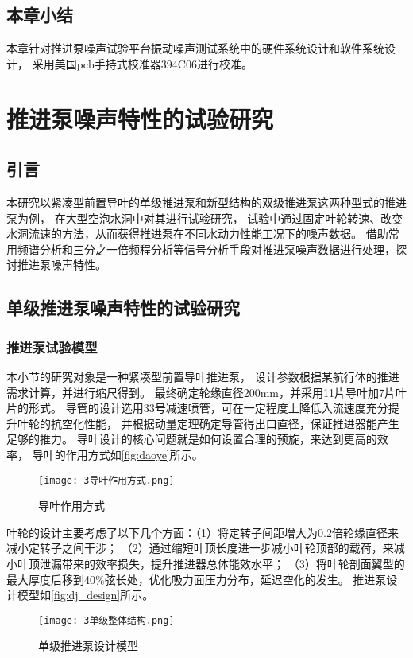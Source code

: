 \section{本章小结}
本章针对推进泵噪声试验平台振动噪声测试系统中的硬件系统设计和软件系统设计，
采用美国pcb手持式校准器394C06进行校准。

\chapter{推进泵噪声特性的试验研究}\label{ch:chapter3}
\section{引言}
本研究以紧凑型前置导叶的单级推进泵和新型结构的双级推进泵这两种型式的推进泵为例，
在大型空泡水洞中对其进行试验研究，
试验中通过固定叶轮转速、改变水洞流速的方法，从而获得推进泵在不同水动力性能工况下的噪声数据。
借助常用频谱分析和三分之一倍频程分析等信号分析手段对推进泵噪声数据进行处理，探讨推进泵噪声特性。
\section{单级推进泵噪声特性的试验研究}
\subsection{推进泵试验模型}
本小节的研究对象是一种紧凑型前置导叶推进泵，
设计参数根据某航行体的推进需求计算，并进行缩尺得到。
最终确定轮缘直径200mm，并采用11片导叶加7片叶片的形式。
导管的设计选用33号减速喷管，可在一定程度上降低入流速度充分提升叶轮的抗空化性能，
并根据动量定理确定导管得出口直径，保证推进器能产生足够的推力。
导叶设计的核心问题就是如何设置合理的预旋，来达到更高的效率，
导叶的作用方式如\autoref{fig:daoye}所示。
\begin{figure}[htbp]
    \centering
    \texttt{[image: 3导叶作用方式.png]}
    \caption{\label{fig:daoye}导叶作用方式}
\end{figure}
叶轮的设计主要考虑了以下几个方面：（1）将定转子间距增大为0.2倍轮缘直径来减小定转子之间干涉；
（2）通过缩短叶顶长度进一步减小叶轮顶部的载荷，来减小叶顶泄漏带来的效率损失，提升推进器总体能效水平；
（3）将叶轮剖面翼型的最大厚度后移到40\%弦长处，优化吸力面压力分布，延迟空化的发生。
推进泵设计模型如\autoref{fig:dj_design}所示。
\begin{figure}[htbp]
    \centering
    \texttt{[image: 3单级整体结构.png]}
    \caption{\label{fig:dj_design}单级推进泵设计模型}
\end{figure}

